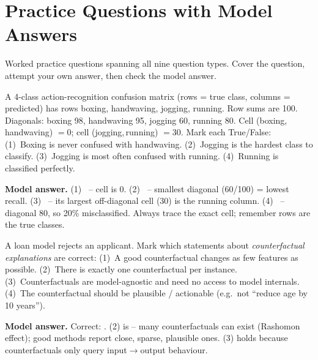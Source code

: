 \section{Practice Questions with Model Answers}
\label{sec:practice}

Worked practice questions spanning all nine question types. Cover the question,
attempt your own answer, then check the model answer.

\begin{qbox}
A 4-class action-recognition confusion matrix (rows = true class, columns =
predicted) has rows boxing, handwaving, jogging, running. Row sums are 100.
Diagonals: boxing 98, handwaving 95, jogging 60, running 80. Cell
(boxing,\,handwaving) $=0$; cell (jogging,\,running) $=30$.
Mark each True/False:
(1)~Boxing is never confused with handwaving.
(2)~Jogging is the hardest class to classify.
(3)~Jogging is most often confused with running.
(4)~Running is classified perfectly.

\medskip\noindent\textbf{Model answer.}
(1)~ -- cell is 0.
(2)~ -- smallest diagonal (60/100) = lowest recall.
(3)~ -- its largest off-diagonal cell (30) is the running column.
(4)~ -- diagonal 80, so 20\% misclassified. Always trace the exact
cell; remember rows are the true classes.
\end{qbox}

\begin{qbox}
A loan model rejects an applicant. Mark which statements about \emph{counterfactual
explanations} are correct:
(1)~A good counterfactual changes as few features as possible.
(2)~There is exactly one counterfactual per instance.
(3)~Counterfactuals are model-agnostic and need no access to model internals.
(4)~The counterfactual should be plausible / actionable (e.g.\ not ``reduce age
by 10 years'').

\medskip\noindent\textbf{Model answer.}
Correct: .
(2) is  -- many counterfactuals can exist (Rashomon effect); good
methods report close, sparse, plausible ones. (3) holds because counterfactuals
only query input$\to$output behaviour.
\end{qbox}

